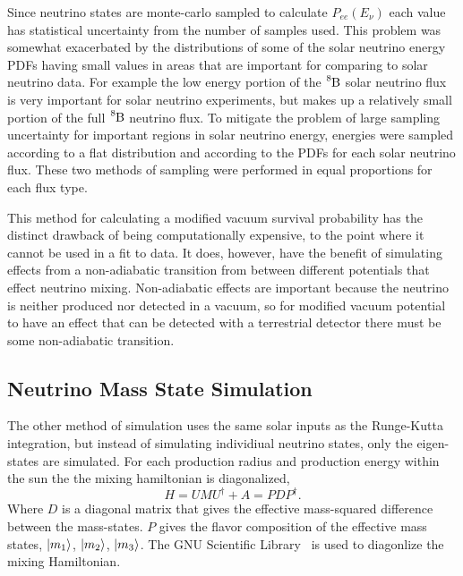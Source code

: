 Since neutrino states are monte-carlo sampled to calculate $P_{ee}(E_{\nu})$
each value has statistical uncertainty from the number of samples used.
This problem was somewhat exacerbated by the distributions of some of the
solar neutrino energy PDFs having small values in areas that are important for
comparing to solar neutrino data. For example the low energy portion of the
$\ce{^{8}B}$ solar neutrino flux is very important for solar neutrino experiments,
but makes up a relatively small portion of the full $\ce{^{8}B}$ neutrino flux.
To mitigate the problem of large sampling uncertainty for important regions in
solar neutrino energy, energies were sampled according to a flat distribution
and according to the PDFs for each solar neutrino flux. These two methods of sampling
were performed in equal proportions for each flux type.

This method for calculating a modified vacuum survival probability has the
distinct drawback of being computationally expensive, to the point
where it cannot be used in a fit to data.
It does, however, have the benefit of simulating effects from a non-adiabatic
transition from between different potentials that effect neutrino mixing.
Non-adiabatic effects are important because the neutrino is neither produced nor
detected in a vacuum, so for modified vacuum potential to have an effect
that can be detected with a terrestrial detector there must be some
non-adiabatic transition.

\subsection{Neutrino Mass State Simulation} %
The other method of simulation uses the same solar inputs as the
Runge-Kutta integration, but instead of simulating individiual neutrino
states, only the eigen-states are simulated.
For each production radius and production energy within the sun the
the mixing hamiltonian is diagonalized,
\begin{equation}
    H = U M U^{\dagger} + A = P D P^{\dagger}\text{.}
\end{equation}
Where $D$ is a diagonal matrix that gives the effective mass-squared
difference between the mass-states.
$P$ gives the flavor composition of the effective mass states,
$\ket{m_{1}}$, $\ket{m_{2}}$, $\ket{m_{3}}$.
The GNU Scientific Library~\cite{gsl_ref} is used to diagonlize
the mixing Hamiltonian.

